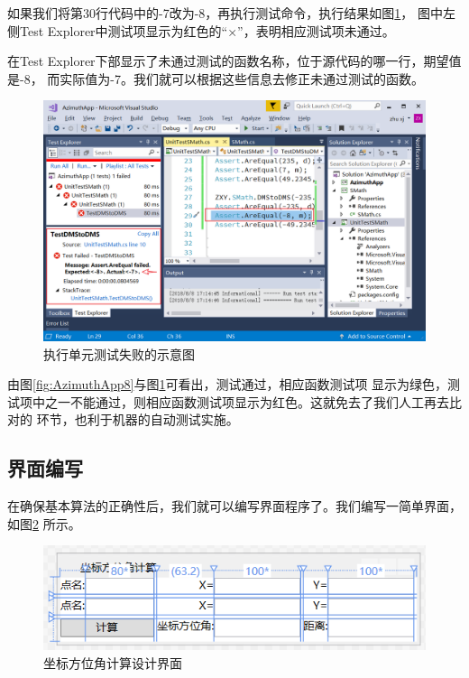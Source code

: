 如果我们将第30行代码中的-7改为-8，再执行测试命令，执行结果如图\ref{fig:AzimuthApp9}，
图中左侧Test Explorer中测试项显示为红色的``×''，表明相应测试项未通过。

在Test Explorer下部显示了未通过测试的函数名称，位于源代码的哪一行，期望值是-8，
而实际值为-7。我们就可以根据这些信息去修正未通过测试的函数。

\begin{figure}[htbp]
    \centering
    \includegraphics[scale=0.65]{surveybase/AzimuthApp9.png}
    \caption{执行单元测试失败的示意图}
    \label{fig:AzimuthApp9}
\end{figure}

由图\ref{fig:AzimuthApp8}与图\ref{fig:AzimuthApp9}可看出，测试通过，相应函数测试项
显示为绿色，测试项中之一不能通过，则相应函数测试项显示为红色。这就免去了我们人工再去比对的
环节，也利于机器的自动测试实施。

\subsection{界面编写}

在确保基本算法的正确性后，我们就可以编写界面程序了。我们编写一简单界面，如图\ref{fig:AzimuthUI1}
所示。

\begin{figure}[htbp]
    \centering
    \includegraphics[scale=1]{surveybase/AzimuthUI1.png}
    \caption{坐标方位角计算设计界面}
    \label{fig:AzimuthUI1}
\end{figure}

